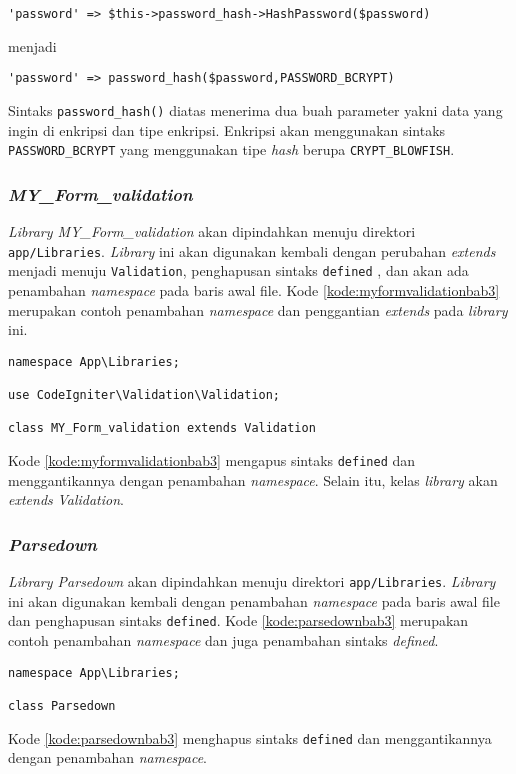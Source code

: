 \begin{center}
\verb|'password' => $this->password_hash->HashPassword($password)|
\end{center}
menjadi
\begin{center}
\verb|'password' => password_hash($password,PASSWORD_BCRYPT)|
\end{center}

Sintaks \texttt{password\_hash()} diatas menerima dua buah parameter yakni data yang ingin di enkripsi dan tipe enkripsi. Enkripsi akan menggunakan sintaks \texttt{PASSWORD\_BCRYPT} yang menggunakan tipe \textit{hash} berupa \texttt{CRYPT\_BLOWFISH}.

\subsubsection{\textit{MY\_Form\_validation}}
\textit{Library MY\_Form\_validation} akan dipindahkan menuju direktori \texttt{app/Libraries}. \textit{Library} ini akan digunakan kembali dengan perubahan \textit{extends} menjadi menuju \texttt{Validation}, penghapusan sintaks \texttt{defined} , dan akan ada penambahan \textit{namespace} pada baris awal file. Kode \ref{kode:myformvalidationbab3} merupakan contoh penambahan \textit{namespace} dan penggantian \textit{extends} pada \textit{library} ini.
\begin{lstlisting}[caption=Contoh perubahan \textit{library MY\_Form\_validation} pada \textit{CodeIgniter 4}, label=kode:myformvalidationbab3]
namespace App\Libraries;

use CodeIgniter\Validation\Validation;

class MY_Form_validation extends Validation
\end{lstlisting}
Kode \ref{kode:myformvalidationbab3} mengapus sintaks \texttt{defined} dan menggantikannya dengan penambahan \textit{namespace}. Selain itu, kelas \textit{library} akan \textit{extends} \textit{Validation}.

\subsubsection{\textit{Parsedown}}
\textit{Library Parsedown} akan dipindahkan menuju direktori \texttt{app/Libraries}. \textit{Library} ini akan digunakan kembali dengan penambahan \textit{namespace} pada baris awal file dan penghapusan sintaks \texttt{defined}.  Kode \ref{kode:parsedownbab3} merupakan contoh penambahan \textit{namespace} dan juga penambahan sintaks \textit{defined}.
\begin{lstlisting}[caption=Contoh perubahan \textit{library Parsedown} pada \textit{CodeIgniter 4}, label=kode:parsedownbab3]
namespace App\Libraries;

class Parsedown
\end{lstlisting}
Kode \ref{kode:parsedownbab3} menghapus sintaks \texttt{defined} dan menggantikannya dengan penambahan \textit{namespace}.
